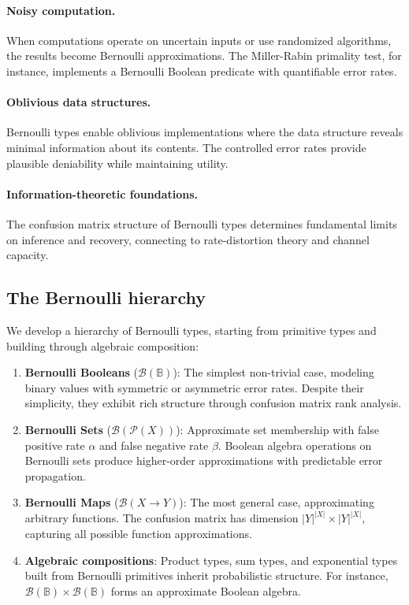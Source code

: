 \documentclass[11pt,final,hidelinks]{article}
\newcommand{\powerset}{\mathcal{P}}  %
\newcommand{\FPR}{\alpha}          %
\newcommand{\FNR}{\beta}           %
\newcommand{\Bool}{\mathbb{B}}     %
\newcommand{\Ber}[1]{\mathcal{B}(#1)}  %
\theoremstyle{plain}
\begin{document}
\paragraph{Noisy computation.} When computations operate on uncertain inputs or use randomized algorithms, the results become Bernoulli approximations. The Miller-Rabin primality test, for instance, implements a Bernoulli Boolean predicate with quantifiable error rates.

\paragraph{Oblivious data structures.} Bernoulli types enable oblivious implementations where the data structure reveals minimal information about its contents. The controlled error rates provide plausible deniability while maintaining utility.

\paragraph{Information-theoretic foundations.} The confusion matrix structure of Bernoulli types determines fundamental limits on inference and recovery, connecting to rate-distortion theory and channel capacity.

\subsection{The Bernoulli hierarchy}

We develop a hierarchy of Bernoulli types, starting from primitive types and building through algebraic composition:

\begin{enumerate}
\item \textbf{Bernoulli Booleans} ($\Ber{\Bool}$): The simplest non-trivial case, modeling binary values with symmetric or asymmetric error rates. Despite their simplicity, they exhibit rich structure through confusion matrix rank analysis.

\item \textbf{Bernoulli Sets} ($\Ber{\powerset(X)}$): Approximate set membership with false positive rate $\FPR$ and false negative rate $\FNR$. Boolean algebra operations on Bernoulli sets produce higher-order approximations with predictable error propagation.

\item \textbf{Bernoulli Maps} ($\Ber{X \to Y}$): The most general case, approximating arbitrary functions. The confusion matrix has dimension $|Y|^{|X|} \times |Y|^{|X|}$, capturing all possible function approximations.

\item \textbf{Algebraic compositions}: Product types, sum types, and exponential types built from Bernoulli primitives inherit probabilistic structure. For instance, $\Ber{\Bool} \times \Ber{\Bool}$ forms an approximate Boolean algebra.
\end{enumerate}
\end{document}
